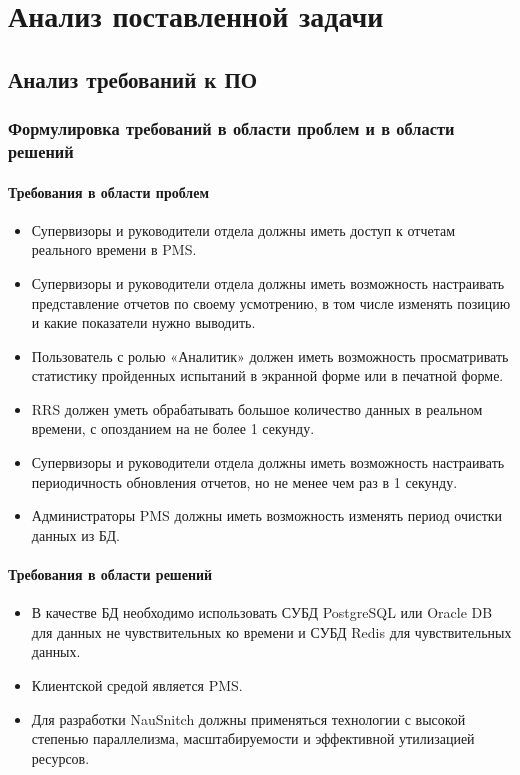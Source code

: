 \chapter{Анализ поставленной задачи}
\label{ch:analysis}

\section{Анализ требований к ПО}

\subsection{Формулировка требований в области проблем и в области решений} %

\subsubsection{Требования в области проблем}

\begin{itemize}
    \item Супервизоры и руководители отдела должны иметь доступ к отчетам реального времени в PMS\@.
    \item Супервизоры и руководители отдела должны иметь возможность настраивать представление отчетов по своему усмотрению, в том числе изменять позицию и какие показатели нужно выводить.
    \item Пользователь с ролью «Аналитик» должен иметь возможность просматривать статистику пройденных испытаний в экранной форме или в печатной форме.
    \item RRS должен уметь обрабатывать большое количество данных в реальном времени, с опозданием на не более 1 секунду.
    \item Супервизоры и руководители отдела должны иметь возможность настраивать периодичность обновления отчетов, но не менее чем раз в 1 секунду.
    \item Администраторы PMS должны иметь возможность изменять период очистки данных из БД.
\end{itemize}

\subsubsection{Требования в области решений}

\begin{itemize}
    \item В качестве БД необходимо использовать СУБД PostgreSQL или Oracle DB для данных не чувствительных ко времени и СУБД Redis для чувствительных данных.
    \item Клиентской средой является PMS\@.
    \item Для разработки NauSnitch должны применяться технологии с высокой степенью параллелизма, масштабируемости и эффективной утилизацией ресурсов.
\end{itemize}

